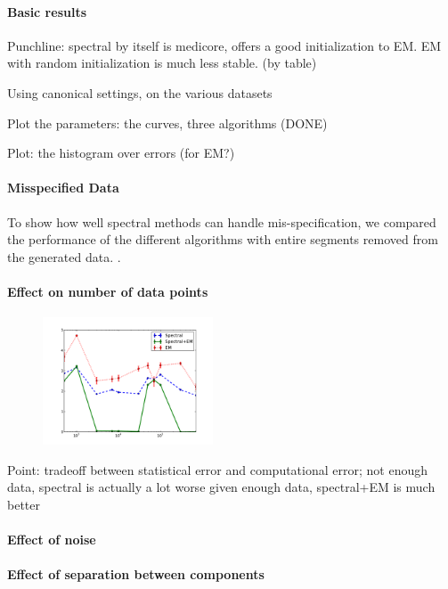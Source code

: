 \paragraph{Basic results}

Punchline: spectral by itself is medicore, offers a good initialization to EM.
EM with random initialization is much less stable. (by table)

Using canonical settings, on the various datasets

Plot the parameters: the curves, three algorithms (DONE)

Plot: the histogram over errors (for EM?)

\paragraph{Misspecified Data}

To show how well spectral methods can handle mis-specification, we
compared the performance of the different algorithms with entire
segments removed from the generated data. .

\paragraph{Effect on number of data points}

\begin{figure}[t]
  \centering
  \includegraphics[width=0.45\textwidth]{figures/vs-n/1-8-3-3.pdf}
  \caption{}
  \label{fig:vs-n}
\end{figure}


Point: tradeoff between statistical error and computational error;
not enough data, spectral is actually a lot worse
given enough data, spectral+EM is much better

\paragraph{Effect of noise}

\paragraph{Effect of separation between components}
